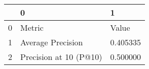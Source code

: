 \begin{tabular}{lll}
\toprule
 & 0 & 1 \\
\midrule
0 & Metric & Value \\
1 & Average Precision & 0.405335 \\
2 & Precision at 10 (P@10) & 0.500000 \\
\bottomrule
\end{tabular}

